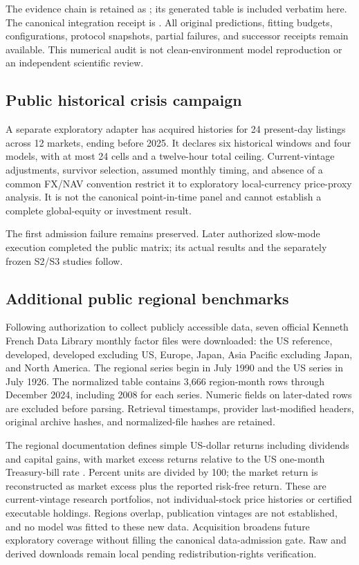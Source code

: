 \documentclass[11pt,a4paper]{article}
\begin{document}
The evidence chain is retained as ; its generated table is included verbatim here. The canonical integration receipt is . All original predictions, fitting budgets, configurations, protocol snapshots, partial failures, and successor receipts remain available. This numerical audit is not clean-environment model reproduction or an independent scientific review.

\subsection{Public historical crisis campaign}
A separate exploratory adapter has acquired histories for 24 present-day listings across 12 markets, ending before 2025. It declares six historical windows and four models, with at most 24 cells and a twelve-hour total ceiling. Current-vintage adjustments, survivor selection, assumed monthly timing, and absence of a common FX/NAV convention restrict it to exploratory local-currency price-proxy analysis. It is not the canonical point-in-time panel and cannot establish a complete global-equity or investment result.

The first admission failure remains preserved. Later authorized slow-mode execution completed the public matrix; its actual results and the separately frozen S2/S3 studies follow.




\subsection{Additional public regional benchmarks}
Following authorization to collect publicly accessible data, seven official Kenneth French Data Library monthly factor files were downloaded: the US reference, developed, developed excluding US, Europe, Japan, Asia Pacific excluding Japan, and North America. The regional series begin in July 1990 and the US series in July 1926. The normalized table contains 3,666 region-month rows through December 2024, including 2008 for each series. Numeric fields on later-dated rows are excluded before parsing. Retrieval timestamps, provider last-modified headers, original archive hashes, and normalized-file hashes are retained.

The regional documentation defines simple US-dollar returns including dividends and capital gains, with market excess returns relative to the US one-month Treasury-bill rate \citep{frenchlibrary}. Percent units are divided by 100; the market return is reconstructed as market excess plus the reported risk-free return. These are current-vintage research portfolios, not individual-stock price histories or certified executable holdings. Regions overlap, publication vintages are not established, and no model was fitted to these new data. Acquisition broadens future exploratory coverage without filling the canonical data-admission gate. Raw and derived downloads remain local pending redistribution-rights verification.
\end{document}
